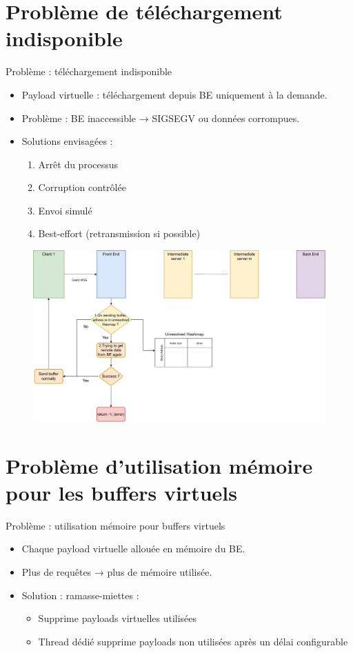 \documentclass[aspectratio=43,8pt]{beamer}
\begin{document}
\section{Problème de téléchargement indisponible}
\begin{frame}{Problème : téléchargement indisponible}
\begin{itemize}
    \item Payload virtuelle : téléchargement depuis BE uniquement à la demande.
    \item Problème : BE inaccessible → SIGSEGV ou données corrompues.
    \item Solutions envisagées :
    \begin{enumerate}
        \item Arrêt du processus
        \item Corruption contrôlée
        \item Envoi simulé
        \item Best-effort (retransmission si possible)
    \end{enumerate}
\end{itemize}
\begin{figure}
    \includegraphics[width=\textwidth]{img2/odb_c_best_effort.jpg}
\end{figure}
\end{frame}

\section{Problème d'utilisation mémoire pour les buffers virtuels}
\begin{frame}{Problème : utilisation mémoire pour buffers virtuels}
\begin{itemize}
    \item Chaque payload virtuelle allouée en mémoire du BE.
    \item Plus de requêtes → plus de mémoire utilisée.
    \item Solution : ramasse-miettes :
    \begin{itemize}
        \item Supprime payloads virtuelles utilisées
        \item Thread dédié supprime payloads non utilisées après un délai configurable
    \end{itemize}
\end{itemize}
\end{frame}
\end{document}
